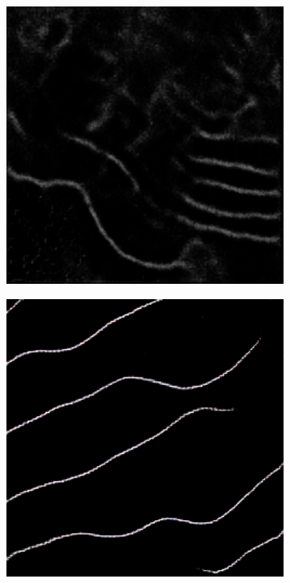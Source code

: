 \begin{figure}[!t]
\begin{subfigure}[t]{0.24\textwidth}
        \caption{}
    \end{subfigure}
    \begin{subfigure}[t]{0.24\textwidth}
        \centering
        \includegraphics[width=1\textwidth, valign=c]{images/segnet_5_predict.png}
        \caption{}
        \label{fig:segexample}
    \end{subfigure}
    \begin{subfigure}[t]{0.24\textwidth}
        \centering
        \includegraphics[width=1\textwidth, valign=c]{images/pix2pix_predict.png}

\end{subfigure}
\end{figure}
